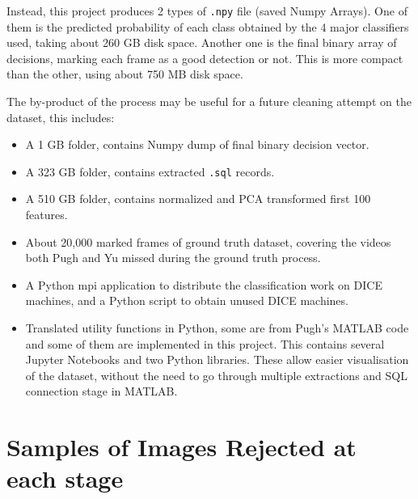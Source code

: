 \documentclass[bsc,logo,twoside,fullspacing,parskip]{infthesis}
\begin{document}
Instead, this project produces 2 types of {\tt .npy} file (saved Numpy Arrays). 
One of them is the predicted probability of each class obtained by the 4 major classifiers used, taking about 260 GB disk space. 
Another one is the final binary array of decisions, marking each frame as a good detection or not. 
This is more compact than the other, using about 750 MB disk space.

The by-product of the process may be useful for a future cleaning attempt on the dataset, this includes:
\begin{itemize}
\setlength{\parskip}{3pt}
\item A 1 GB folder, contains Numpy dump of final binary decision vector.
\item A 323 GB folder, contains extracted {\tt .sql} records.
\item A 510 GB folder, contains normalized and PCA transformed first 100 features.
\item About 20,000 marked frames of ground truth dataset, covering the videos both Pugh and Yu missed during the ground truth process.
\item A Python mpi application to distribute the classification work on DICE machines, and a Python script to obtain unused DICE machines.
\item Translated utility functions in Python, some are from Pugh's MATLAB code and some of them are implemented in this project. 
This contains several Jupyter Notebooks and two Python libraries. 
These allow easier visualisation of the dataset, without the need to go through multiple extractions and SQL connection stage in MATLAB. 
\end{itemize}

\section{Samples of Images Rejected at each stage}
\end{document}
